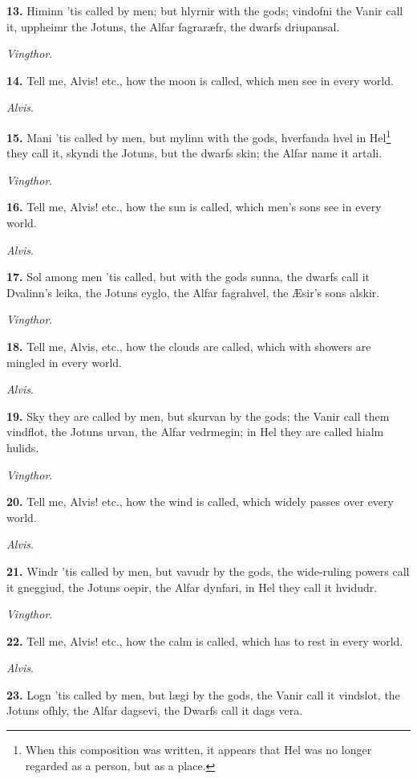 \textbf{13.} Himinn 'tis called by men; but hlyrnir with the gods; vindofni
the Vanir call it, uppheimr the Jotuns, the Alfar fagraræfr, the
dwarfs driupansal.

\emph{Vingthor}.

\textbf{14.} Tell me, Alvis! etc., how the moon is called, which men see in
every world.

\emph{Alvis}.

\textbf{15.} Mani 'tis called by men, but mylinn with the gods, hverfanda
hvel in Hel\footnote{When this composition was written, it appears that Hel
was no longer regarded as a person, but as a place.} they call it, skyndi the Jotuns, but the dwarfs skin;
the Alfar name it artali.

\emph{Vingthor}.

\textbf{16.} Tell me, Alvis! etc., how the sun is called, which men's sons
see in every world.

\emph{Alvis}.

\textbf{17.} Sol among men 'tis called, but with the gods sunna, the dwarfs
call it Dvalinn's leika, the Jotuns eyglo, the Alfar fagrahvel, the
Æsir's sons alskir.

\emph{Vingthor}.

\textbf{18.} Tell me, Alvis, etc., how the clouds are called, which with
showers are mingled in every world.

\emph{Alvis}.

\textbf{19.} Sky they are called by men, but skurvan by the gods; the Vanir
call them vindflot, the Jotuns urvan, the Alfar vedrmegin; in Hel they
are called hialm hulids.

\emph{Vingthor}.

\textbf{20.} Tell me, Alvis! etc., how the wind is called, which widely
passes over every world.

\emph{Alvis}.

\textbf{21.} Windr 'tis called by men, but vavudr by the gods, the
wide-ruling powers call it gneggiud, the Jotuns oepir, the Alfar
dynfari, in Hel they call it hvidudr.

\emph{Vingthor}.

\textbf{22.} Tell me, Alvis! etc., how the calm is called, which has to rest
in every world.

\emph{Alvis}.

\textbf{23.} Logn 'tis called by men, but lægi by the gods, the Vanir call it
vindslot, the Jotuns ofhly, the Alfar dagsevi, the Dwarfs call it dags
vera.

